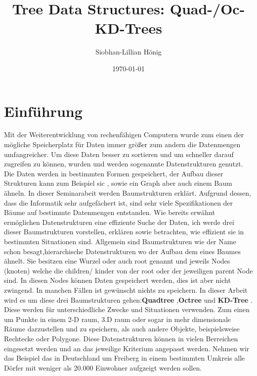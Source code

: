\documentclass[11pt]{article}
\title{\textbf{Tree Data Structures: Quad-/Oc-KD-Trees}}
\author{Siobhan-Lillian Hönig}
\date{\today}
\newcommand{\qt}{Quadtree }
\newcommand{\oc}{Octree }
\newcommand{\kd}{KD-Tree }
\newcommand{\fett}[1]{{\bf #1}}
\begin{document}
\begin{titlepage}
    \maketitle
\end{titlepage}

\pagebreak

\pagebreak
\tableofcontents
\pagebreak



\glsaddall
\printglossary 
\pagebreak

\section{Einführung} \label{Einführung}

Mit der Weiterentwicklung von rechenfähigen Computern wurde zum einen der mögliche Speicherplatz für Daten immer größer zum andern die Datenmengen umfangreicher. Um diese Daten besser zu sortieren und um schneller darauf zugreifen zu können, wurden und werden sogenannte Datenstrukturen genutzt. Die Daten werden in bestimmten Formen gespeichert, der Aufbau dieser Strukturen kann zum Beispiel sic , sowie ein Graph aber auch einem Baum ähneln. 
In dieser Seminarabeit werden Baumstrukturen erklärt. Aufgrund dessen, dass die Informatik sehr aufgefächert ist, sind sehr viele Spezifikationen der Bäume auf bestimmte Datenmengen entstanden.  
Wie bereits erwähnt ermöglichen Datenstrukturen eine effiziente Suche der Daten, ich werde drei dieser Baumstrukturen vorstellen, erklären sowie betrachten, wie effizient sie in bestimmten Situationen sind. 
\newline
Allgemein sind Baumstrukturen wie der Name schon besagt,hierarchische Datenstrukturen wo der Aufbau dem eines Baumes ähnelt. Sie besitzen eine Wurzel oder auch root genannt und jeweils Nodes (knoten) welche die children/ kinder von der root oder der jeweiligen parent Node sind.  In diesen Nodes können Daten gespeichert werden, dies ist aber nicht zwingend. In manchen Fällen ist gewünscht nichts zu speichern.  
In dieser Arbeit wird es um diese drei Baumstrukturen gehen:\fett \qt ,\fett \oc und \fett \kd. Diese werden für unterschiedliche Zwecke und Situationen verwenden. Zum einen um Punkte in einem 2-D raum, 3.D raum oder sogar in mehr dimensionale Räume darzustellen und zu speichern, als auch andere Objekte, beispielsweise Rechtecke oder Polygone.
Diese Datenstrukturen können in vielen Berreichen eingesetzt werden und an das jeweilige Kriterium angepasst werden. Nehmen wir das Beispiel das in Deutschland um Freiberg in einem bestimmten Umkreis alle Dörfer mit weniger als 20.000 Einwohner aufgzeigt werden sollen.\newline 
\end{document}
